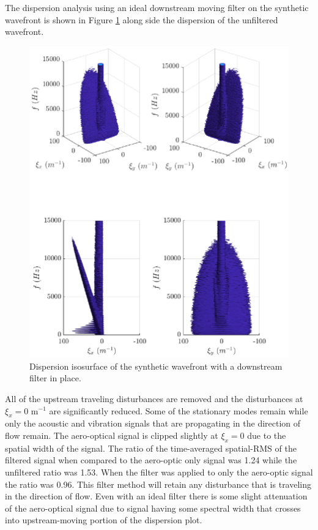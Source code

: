 The dispersion analysis using an ideal downstream moving filter on the synthetic wavefront is shown in Figure \ref{fig:06_filter_downstream} along side the dispersion of the unfiltered wavefront.
\begin{figure}
 \centering
 \includegraphics{../matlab/06_single_sensor_filtering/filter_downstream.eps}
 \caption{Dispersion isosurface of the synthetic wavefront with a downstream filter in place.}
 \label{fig:06_filter_downstream}
\end{figure}
All of the upstream traveling disturbances are removed and the disturbances at $\xi_x=0$ m$^{-1}$ are significantly reduced.
Some of the stationary modes remain while only the acoustic and vibration signals that are propagating in the direction of flow remain.
The aero-optical signal is clipped slightly at $\xi_x=0$ due to the spatial width of the signal.
The ratio of the time-averaged spatial-RMS of the filtered signal when compared to the aero-optic only signal was 1.24 while the unfiltered ratio was 1.53.
When the filter was applied to only the aero-optic signal the ratio was 0.96.
This filter method will retain any disturbance that is traveling in the direction of flow.
Even with an ideal filter there is some slight attenuation of the aero-optical signal due to signal having some spectral width that crosses into upstream-moving portion of the dispersion plot.


